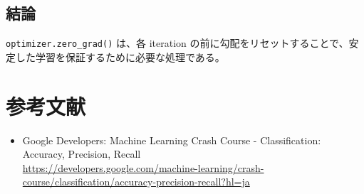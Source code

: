 \documentclass[a4paper,11pt]{article}
\begin{document}
\subsection{結論}
\texttt{optimizer.zero\_grad()} は、各 iteration の前に勾配をリセットすることで、安定した学習を保証するために必要な処理である。

\section*{参考文献}
\begin{itemize}
  \item Google Developers: Machine Learning Crash Course - Classification: Accuracy, Precision, Recall \\
  \url{https://developers.google.com/machine-learning/crash-course/classification/accuracy-precision-recall?hl=ja}
\end{itemize}
\end{document}
